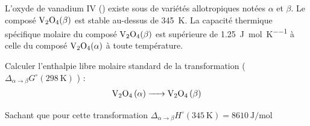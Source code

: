%
\begin{exercise}

L'oxyde de vanadium IV () existe sous de variétés allotropiques notées
$\alpha$ et $\beta$. Le composé $\ce{V2O4(\beta)}$ est stable au-dessus de \SI{345}{\kelvin}.
La capacité thermique spécifique molaire du composé $\ce{V2O4(\beta)}$ est supérieure de
\SI{1.25}{\joule\per\mole\per\kelvin} à celle du composé $\ce{V2O4(\alpha)}$ à toute température.

Calculer l’enthalpie libre molaire standard de la transformation ($\Delta_{\alpha \to \beta } G^\circ (298 ~ \si{\kelvin})$ ) :
\begin{align*}
	\ce{V2O4 (\alpha) ->  V2O4 (\beta)}
\end{align*}

Sachant que pour cette transformation $\Delta_{\alpha \to \beta } H^\circ (345 ~ \si{\kelvin}) = 8610 ~ \si{\joule\per\mole}$

\end{exercise}
